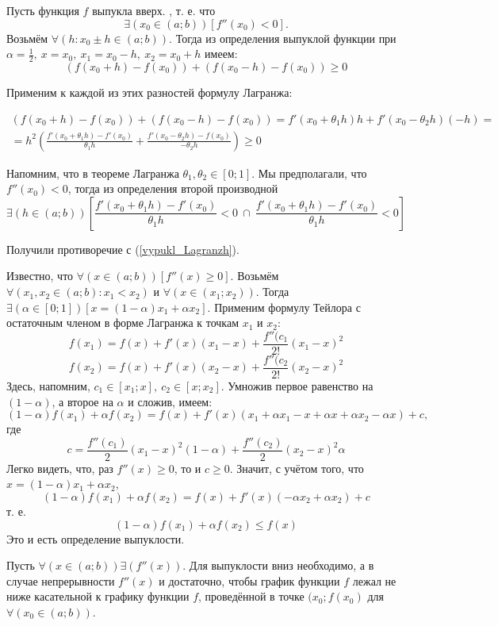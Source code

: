 \neobh
Пусть функция $f$ выпукла вверх.
\pp, т. е. что
$$
\exists(x_0\in(a;b))[f''(x_0)<0].
$$
Возьмём $\forall(h:x_0\pm h\in(a;b))$. Тогда из определения выпуклой функции при $\alpha=\frac{1}{2},~x=x_0,~x_1=x_0-h,~x_2=x_0+h$ имеем:
$$
(f(x_0+h)-f(x_0))+(f(x_0-h)-f(x_0))\geq 0
$$

Применим к каждой из этих разностей формулу Лагранжа:

\begin{multline}\label{vypukl_Lagranzh}
(f(x_0+h)-f(x_0))+(f(x_0-h)-f(x_0))=
f'(x_0+\theta_1 h)h+f'(x_0-\theta_2 h)(-h)=\\=
h^2\left(  \frac{f'(x_0+\theta_1 h)-f'(x_0)}{\theta_1 h} + \frac{f'(x_0-\theta_2 h)-f(x_0)}{-\theta_2 h} \right)  \geq 0
\end{multline}

Напомним, что в теореме Лагранжа $\theta_1,\theta_2 \in [0;1]$.
Мы предполагали, что $f''(x_0)<0$, тогда из определения второй производной
$$
\exists(h\in(a;b))\left[
\frac{f'(x_0+\theta_1 h)-f'(x_0)}{\theta_1 h}<0
~\cap~
\frac{f'(x_0+\theta_1 h)-f'(x_0)}{\theta_1 h}<0
\right]
$$

Получили противоречие с (\ref{vypukl_Lagranzh}).

\dost
Известно, что $\forall(x\in(a;b))[f''(x)\geq 0]$.
Возьмём $\forall(x_1,x_2 \in (a;b) : x_1 < x_2)$ и $\forall(x\in(x_1;x_2))$.
Тогда $\exists(\alpha\in[0;1])[x=(1-\alpha)x_1+\alpha x_2]$.
Применим формулу Тейлора с остаточным членом в форме Лагранжа к точкам $x_1$ и $x_2$:
$$
f(x_1)=f(x)+f'(x)(x_1-x)+\frac{f''(c_1}{2!}(x_1-x)^2
$$
$$
f(x_2)=f(x)+f'(x)(x_2-x)+\frac{f''(c_2}{2!}(x_2-x)^2
$$
Здесь, напомним, $c_1\in[x_1;x],~c_2\in[x;x_2]$. Умножив первое равенство на $(1-\alpha)$, а второе на $\alpha$ и сложив, имеем:
$$
(1-\alpha)f(x_1)+\alpha f(x_2)=f(x)+f'(x)(x_1+\alpha x_1 - x + \alpha x + \alpha x_2 - \alpha x)+c,
$$
где
$$
c=\frac{f''(c_1)}{2}(x_1-x)^2 (1-\alpha)+\frac{f''(c_2)}{2}(x_2-x)^2 \alpha
$$
Легко видеть, что, раз $f''(x)\geq 0$, то и $c\geq 0$.
Значит, с учётом того, что $x=(1-\alpha)x_1+\alpha x_2$, 
$$
(1-\alpha)f(x_1)+\alpha f (x_2)=f(x)+f'(x)(-\alpha x_2 + \alpha x_2)+c
$$
т. е.
$$
(1-\alpha)f(x_1)+\alpha f (x_2) \leq f(x) 
$$
Это и есть определение выпуклости.
\dokno

\begin{teorema}\label{vypukl_th_2}
Пусть $\forall(x\in(a;b))\exists(f''(x))$. Для выпуклости вниз необходимо, а в случае непрерывности $f''(x)$ и достаточно, чтобы график функции $f$ лежал не ниже касательной к графику функции $f$, проведённой в точке $(x_0;f(x_0)$ для $\forall (x_0\in(a;b))$.
\end{teorema}

